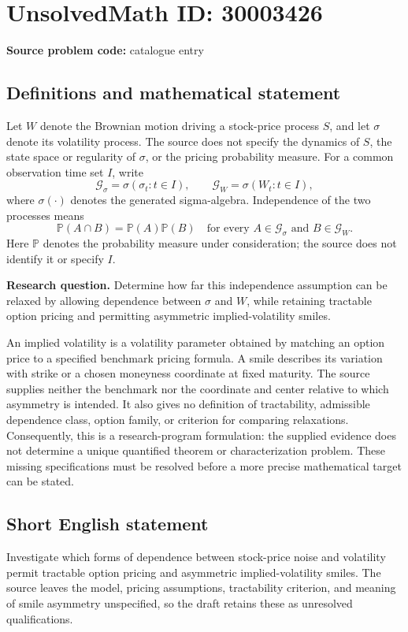 \documentclass[11pt]{article}
\begin{document}
\section*{UnsolvedMath ID: 30003426}
\textbf{Source problem code:} catalogue entry
\subsection{Definitions and mathematical statement}
Let \(W\) denote the Brownian motion driving a stock-price process \(S\), and let \(\sigma\) denote its volatility process. The source does not specify the dynamics of \(S\), the state space or regularity of \(\sigma\), or the pricing probability measure. For a common observation time set \(I\), write
\[
\mathcal G_{\sigma}=\sigma(\sigma_t:t\in I),\qquad
\mathcal G_W=\sigma(W_t:t\in I),
\]
where \(\sigma(\cdot)\) denotes the generated sigma-algebra. Independence of the two processes means
\[
\mathbb P(A\cap B)=\mathbb P(A)\mathbb P(B)
\quad\text{for every }A\in\mathcal G_{\sigma}\text{ and }B\in\mathcal G_W.
\]
Here \(\mathbb P\) denotes the probability measure under consideration; the source does not identify it or specify \(I\).

\textbf{Research question.} Determine how far this independence assumption can be relaxed by allowing dependence between \(\sigma\) and \(W\), while retaining tractable option pricing and permitting asymmetric implied-volatility smiles.

An implied volatility is a volatility parameter obtained by matching an option price to a specified benchmark pricing formula. A smile describes its variation with strike or a chosen moneyness coordinate at fixed maturity. The source supplies neither the benchmark nor the coordinate and center relative to which asymmetry is intended. It also gives no definition of tractability, admissible dependence class, option family, or criterion for comparing relaxations. Consequently, this is a research-program formulation: the supplied evidence does not determine a unique quantified theorem or characterization problem. These missing specifications must be resolved before a more precise mathematical target can be stated.
\subsection{Short English statement}
Investigate which forms of dependence between stock-price noise and volatility permit tractable option pricing and asymmetric implied-volatility smiles. The source leaves the model, pricing assumptions, tractability criterion, and meaning of smile asymmetry unspecified, so the draft retains these as unresolved qualifications.
\end{document}
